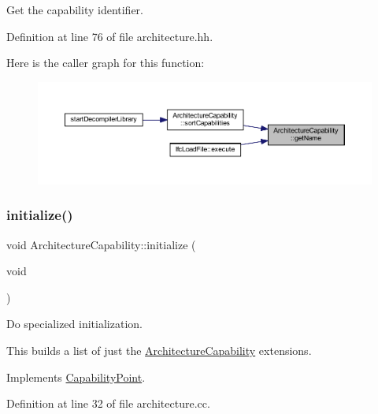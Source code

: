 Get the capability identifier. 



Definition at line 76 of file architecture.\+hh.

Here is the caller graph for this function\+:
\nopagebreak
\begin{figure}[H]
\begin{center}
\leavevmode
\includegraphics[width=350pt]{class_architecture_capability_ad8a6f6079fde87a12582a68bfeab73af_icgraph}
\end{center}
\end{figure}
\mbox{\label{class_architecture_capability_af414aa921939711c0199d02e2ff35e26}} 
\subsubsection{\texorpdfstring{initialize()}{initialize()}}
{\footnotesize\ttfamily void Architecture\+Capability\+::initialize (\begin{DoxyParamCaption}\item[{void}]{ }\end{DoxyParamCaption})\hspace{0.3cm}{\ttfamily [virtual]}}



Do specialized initialization. 

This builds a list of just the \mbox{\hyperlink{class_architecture_capability}{Architecture\+Capability}} extensions. 

Implements \mbox{\hyperlink{class_capability_point_a493d24125e7e024a9b2d6c2ad4bfbfab}{Capability\+Point}}.



Definition at line 32 of file architecture.\+cc.

\mbox{\label{class_architecture_capability_aa3d4fed15e42f3e853851babaf379376}} 

